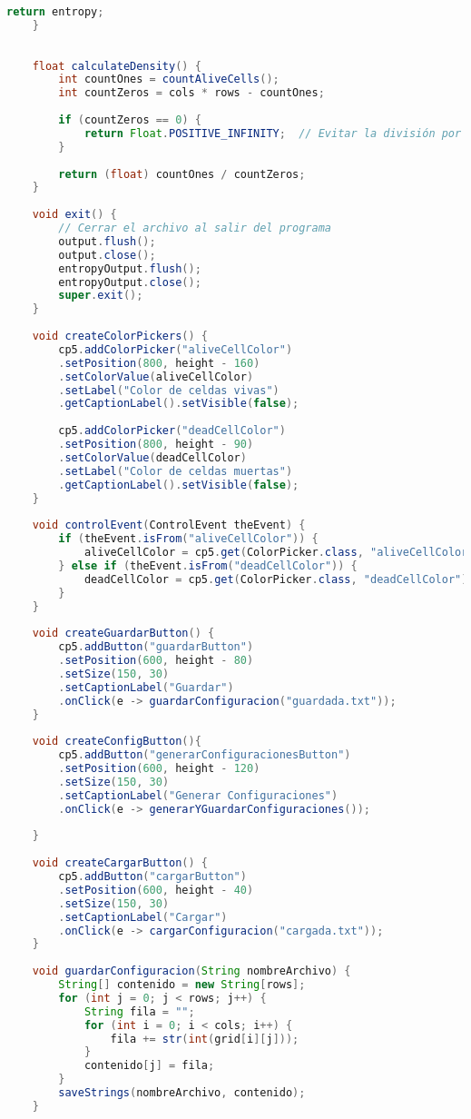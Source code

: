 \documentclass{article}
\begin{document}
\begin{lstlisting}[language=Java, basicstyle=\tiny, breaklines=true, breakatwhitespace=true]
 		return entropy;
 	}
 	
 	
 	float calculateDensity() {
 		int countOnes = countAliveCells();
 		int countZeros = cols * rows - countOnes;
 		
 		if (countZeros == 0) {
 			return Float.POSITIVE_INFINITY;  // Evitar la división por cero
 		}
 		
 		return (float) countOnes / countZeros;
 	}
 	
 	void exit() {
 		// Cerrar el archivo al salir del programa
 		output.flush();
 		output.close();
 		entropyOutput.flush();
 		entropyOutput.close();
 		super.exit();
 	}
 	
 	void createColorPickers() {
 		cp5.addColorPicker("aliveCellColor")
 		.setPosition(800, height - 160)
 		.setColorValue(aliveCellColor)
 		.setLabel("Color de celdas vivas")
 		.getCaptionLabel().setVisible(false);
 		
 		cp5.addColorPicker("deadCellColor")
 		.setPosition(800, height - 90)
 		.setColorValue(deadCellColor)
 		.setLabel("Color de celdas muertas")
 		.getCaptionLabel().setVisible(false);
 	}
 	
 	void controlEvent(ControlEvent theEvent) {
 		if (theEvent.isFrom("aliveCellColor")) {
 			aliveCellColor = cp5.get(ColorPicker.class, "aliveCellColor").getColorValue();
 		} else if (theEvent.isFrom("deadCellColor")) {
 			deadCellColor = cp5.get(ColorPicker.class, "deadCellColor").getColorValue();
 		}
 	}
 	
 	void createGuardarButton() {
 		cp5.addButton("guardarButton")
 		.setPosition(600, height - 80)
 		.setSize(150, 30)
 		.setCaptionLabel("Guardar")
 		.onClick(e -> guardarConfiguracion("guardada.txt"));
 	}
 	
 	void createConfigButton(){
 		cp5.addButton("generarConfiguracionesButton")
 		.setPosition(600, height - 120)
 		.setSize(150, 30)
 		.setCaptionLabel("Generar Configuraciones")
 		.onClick(e -> generarYGuardarConfiguraciones());
 		
 	}
 	
 	void createCargarButton() {
 		cp5.addButton("cargarButton")
 		.setPosition(600, height - 40)
 		.setSize(150, 30)
 		.setCaptionLabel("Cargar")
 		.onClick(e -> cargarConfiguracion("cargada.txt"));
 	}
 	
 	void guardarConfiguracion(String nombreArchivo) {
 		String[] contenido = new String[rows];
 		for (int j = 0; j < rows; j++) {
 			String fila = "";
 			for (int i = 0; i < cols; i++) {
 				fila += str(int(grid[i][j]));
 			}
 			contenido[j] = fila;
 		}
 		saveStrings(nombreArchivo, contenido);
 	}
 	

\end{lstlisting}
\end{document}
